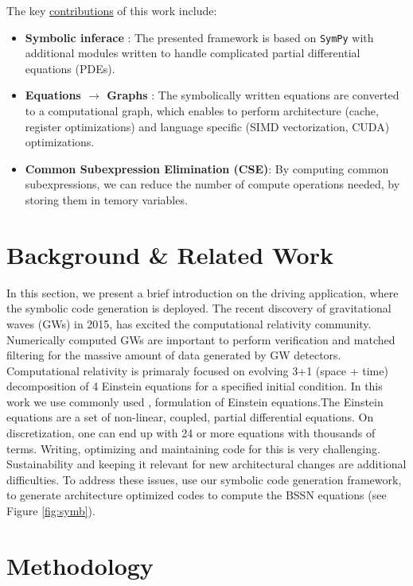 \documentclass[10pt, conference]{IEEEtran} %
\begin{document}
\noindent The key \ul{contributions} of this work include:
\begin{itemize}
	\item \textbf{Symbolic inferace} : The presented framework is based on \texttt{SymPy} with additional modules written to handle complicated partial differential equations (PDEs). 
	\item \textbf{Equations $\rightarrow$ Graphs} : The symbolically written equations are converted to a computational graph, which enables to perform architecture (cache, register optimizations) and language specific (SIMD vectorization, CUDA) optimizations.
	\item \textbf{Common Subexpression Elimination (CSE)}: By computing common subexpressions, we can reduce the number of compute operations needed, by storing them in temory variables. 
\end{itemize}

\section{Background \& Related Work}
In this section, we present a brief introduction on the driving application, where the symbolic code generation is deployed. The recent discovery of gravitational waves (GWs) in 2015, has excited the computational relativity community. Numerically computed GWs are important to perform verification and matched filtering for the massive amount of data generated by GW detectors. Computational relativity is primaraly focused on evolving 3+1 (space + time) decomposition of 4 Einstein equations for a specified initial condition. In this work we use commonly used \bssn, formulation of Einstein equations.The Einstein equations are a set of non-linear, coupled, partial differential equations. On discretization, one can end up with 24 or more equations with thousands of terms. Writing, optimizing and maintaining  code for this is very challenging. Sustainability and keeping it relevant for new  architectural changes are additional difficulties. To address these issues, use our symbolic code generation framework, to generate architecture optimized codes to compute the BSSN equations (see Figure \ref{fig:symb}).  

\section{Methodology}
\end{document}
